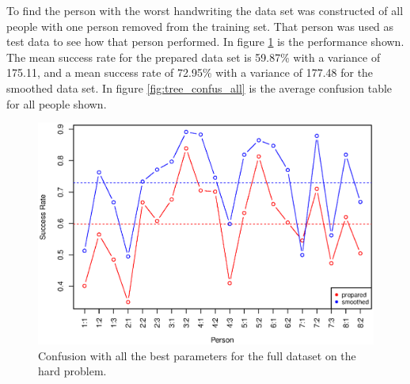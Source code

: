 To find the person with the worst handwriting the data set was constructed of all people with one person removed from the training set.
That person was used as test data to see how that person performed.
In figure \ref{fig:tree_performance_all} is the performance shown.
The mean success rate for the prepared data set is 59.87\% with a variance of 175.11, 
and a mean success rate of 72.95\% with a variance of 177.48 for the smoothed data set.
In figure \ref{fig:tree_confus_all} is the average confusion table for all people shown.

\begin{figure}[H]
\centering
\includegraphics[width=\textwidth]{graphics/tree_performance_all_combined}
\caption[Success for decision tree on the hard problem.]{Confusion with all the best parameters for the full dataset on the hard problem.}
\label{fig:tree_performance_all}
\end{figure}

